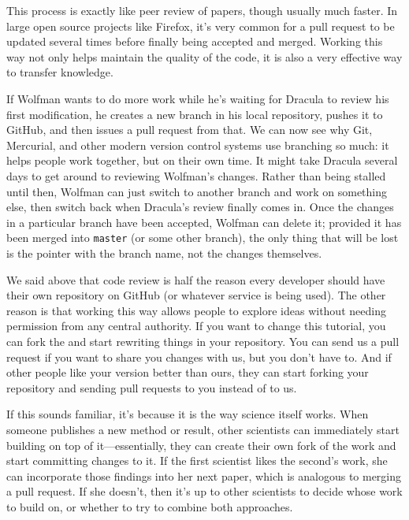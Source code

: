 This process is exactly like peer review of papers, though usually much
faster. In large open source projects like Firefox, it's very common for
a pull request to be updated several times before finally being accepted
and merged. Working this way not only helps maintain the quality of the
code, it is also a very effective way to transfer knowledge.

If Wolfman wants to do more work while he's waiting for Dracula to
review his first modification, he creates a new branch in his local
repository, pushes it to GitHub, and then issues a pull request from
that. We can now see why Git, Mercurial, and other modern version
control systems use branching so much: it helps people work together,
but on their own time. It might take Dracula several days to get around
to reviewing Wolfman's changes. Rather than being stalled until then,
Wolfman can just switch to another branch and work on something else,
then switch back when Dracula's review finally comes in. Once the
changes in a particular branch have been accepted, Wolfman can delete
it; provided it has been merged into \texttt{master} (or some other
branch), the only thing that will be lost is the pointer with the branch
name, not the changes themselves.

We said above that code review is half the reason every developer should
have their own repository on GitHub (or whatever service is being used).
The other reason is that working this way allows people to explore ideas
without needing permission from any central authority. If you want to
change this tutorial, you can fork the
 and start rewriting things in your repository. You can send
us a pull request if you want to share you changes with us, but you
don't have to. And if other people like your version better than ours,
they can start forking your repository and sending pull requests to you
instead of to us.

If this sounds familiar, it's because it is the way science itself
works. When someone publishes a new method or result, other scientists
can immediately start building on top of it---essentially, they can
create their own fork of the work and start committing changes to it. If
the first scientist likes the second's work, she can incorporate those
findings into her next paper, which is analogous to merging a pull
request. If she doesn't, then it's up to other scientists to decide
whose work to build on, or whether to try to combine both approaches.


